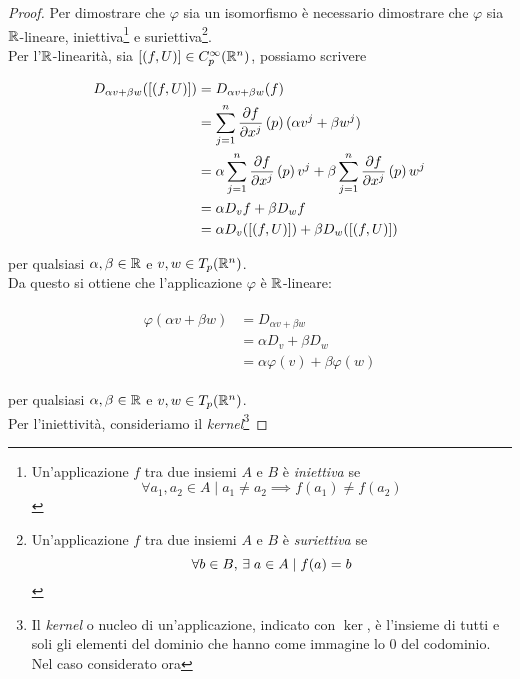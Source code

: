 \begin{proof}
	Per dimostrare che $ \varphi $ sia un isomorfismo è necessario dimostrare che $ \varphi $ sia $ \mathbb{R} $-lineare, iniettiva\footnote{%
		Un'applicazione $ f $ tra due insiemi $ A $ e $ B $ è \textit{iniettiva} se
		\begin{equation*}
			\forall a_{1},a_{2} \in A \mid a_{1} \neq a_{2} \implies f(a_{1}) \neq f(a_{2})
		\end{equation*}%
	} e suriettiva\footnote{%
		Un'applicazione $ f $ tra due insiemi $ A $ e $ B $ è \textit{suriettiva} se
		\begin{equation*}
			\forall b \in B, \, \exists \; a \in A \mid f(a) = b
		\end{equation*}%
	}. \\
	Per l'$ \mathbb{R} $-linearità, sia $ [(f,U)] \in C_{p}^{\infty}(\mathbb{R}^{n}) $, possiamo scrivere
	
	\begin{align}
		\begin{split}
			D_{\alpha v + \beta w} ([(f,U)]) &= D_{\alpha v + \beta w} (f) \\
			&= \sum_{j=1}^{n} \pdv{f}{x^{j}} \, (p) \, (\alpha v^{j} + \beta w^{j}) \\
			&= \alpha \sum_{j=1}^{n} \pdv{f}{x^{j}} \, (p) \, v^{j} + \beta \sum_{j=1}^{n} \pdv{f}{x^{j}} \, (p) \, w^{j} \\
			&= \alpha D_{v} f + \beta D_{w} f \\
			&= \alpha D_{v} ([(f,U)]) + \beta D_{w} ([(f,U)])
		\end{split}
	\end{align}

	per qualsiasi $ \alpha, \beta \in \mathbb{R} $ e $ v, w \in T_{p} (\mathbb{R}^{n}) $. \\
	Da questo si ottiene che l'applicazione $ \varphi $ è $ \mathbb{R} $-lineare:
	
	\begin{align}
		\begin{split}
			\varphi (\alpha v + \beta w) &= D_{\alpha v + \beta w} \\
			&= \alpha D_{v} + \beta D_{w} \\
			&= \alpha \varphi (v) + \beta \varphi (w)
		\end{split}
	\end{align}

	per qualsiasi $ \alpha, \beta \in \mathbb{R} $ e $ v, w \in T_{p} (\mathbb{R}^{n}) $. \\
	Per l'iniettività, consideriamo il \textit{kernel}\footnote{%
		Il \textit{kernel} o nucleo di un'applicazione, indicato con $ \ker $, è l'insieme di tutti e soli gli elementi del dominio che hanno come immagine lo $ 0 $ del codominio. Nel caso considerato ora
		
}
\end{proof}
